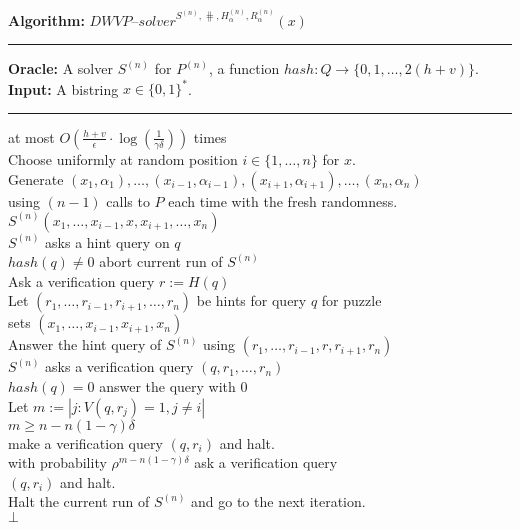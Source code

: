 \begin{codeblock}
  \textbf{Algorithm:} $\mathit{DWVP\text{--}solver}^{S^{(n)}, \hash, H_{\alpha}^{(n)}, R_{\alpha}^{(n)}}(x)$
  \medskip
  \hrule
  \textbf{Oracle:}  A solver $S^{(n)}$ for $P^{(n)}$, a function $hash : Q \rightarrow \{0,1, \dotsc, 2(h+v)\}$.\\
  \textbf{Input:} A bistring $x \in \{0,1\}^{*}$.
  \medskip\hrule
  \Repeat at most $O(\frac{h+v}{\epsilon} \cdot \log(\frac{1}{\gamma\delta}))$ times \\
  \IndI Choose uniformly at random position $i \in \{1, \dotsc, n\}$ for $x$.\\
  \IndI Generate $(x_1, \alpha_1), \dotsc, (x_{i-1}, \alpha_{i-1}), (x_{i+1}, \alpha_{i+1}), \dotsc, (x_n, \alpha_n)$ \\
  \IndI using $(n-1)$ calls to $P$ each time with the fresh randomness.\\
  \IndI \Run $S^{(n)}(x_1, \dotsc, x_{i-1}, x, x_{i+1}, \dotsc, x_n)$\\
  \IndII \If $S^{(n)}$ asks a hint query on $q$ \Then \\
  \IndIII \If $hash(q) \neq 0$ \Then abort current run of $S^{(n)}$\\
  \IndIII Ask a verification query $r := H(q)$\\
  \IndIII Let $(r_1, \dotsc, r_{i-1}, r_{i+1}, \dotsc, r_{n})$ be hints for query $q$ for puzzle\\
  \IndIII sets $(x_1, \dotsc, x_{i-1}, x_{i+1}, x_n)$\\
  \IndIII Answer the hint query of $S^{(n)}$ using $(r_1, \dots, r_{i-1}, r, r_{i+1}, r_n)$\\
  \IndII \If $S^{(n)}$ asks a verification query $(q, r_1, \dots, r_n)$ \Then \\
  \IndIII \If $hash(q) = 0$ \Then answer the query with $0$\\
  \IndIII Let $m := |j: V(q,r_j) = 1, j \neq i|$\\
  \IndIII \If $m \geq n - n(1-\gamma)\delta$ \Then \\
  \IndIIII make a verification query $(q, r_i)$ and halt.\\
  \IndIII \Else with probability $\rho^{m - n(1-\gamma)\delta}$ ask a verification query \\
  \IndIIII $(q, r_i)$ and halt. \\
  \IndIII Halt the current run of $S^{(n)}$ and go to the next iteration.\\
  \Return $\bot$
\end{codeblock}

